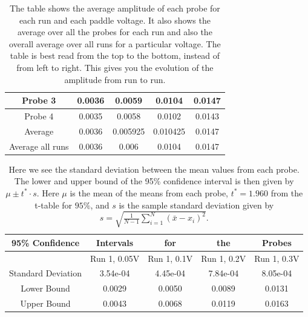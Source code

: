 \documentclass[english,a4paper,12pt]{article}
\begin{document}
\begin{table}[H]
\begin{tabular}{|c|c|c|c|c|}
Probe 3 &         0.0036 &         0.0059 &         0.0104 &         0.0147 \\ \hline
Probe 4 &         0.0035 &         0.0058   &  0.0102 &      0.0143 \\ \hline \hline
Average &  0.0036 &      0.005925 &      0.010425 &       0.0147 \\ \hline \hline \hline
Average all runs & 0.0036 &      0.006 & 0.0104 &         0.0147 \\ \hline
    \end{tabular}
    \caption{The table shows the average amplitude of each probe for each run and each paddle voltage. It also shows the average over all the probes for each run and also the overall average over all runs for a particular voltage. The table is best read from the top to the bottom, instead of from left to right. This gives you the evolution of the amplitude from run to run.}
    \label{tab:amplitudes}
\end{table}

\begin{table}[H]
    \centering
    \begin{tabular}{|c|c|c|c|c|} \hline
    95\% Confidence & Intervals & for & the & Probes\\ \hline \hline
&      Run 1, 0.05V &       Run 1, 0.1V &  Run 1, 0.2V &     Run 1, 0.3V \\ \hline
Standard Deviation & 3.54e-04 & 4.45e-04 & 7.84e-04 & 8.05e-04 \\ \hline
Lower Bound & 0.0029 & 0.0050 & 0.0089 & 0.0131 \\ \hline
Upper Bound & 0.0043 & 0.0068 & 0.0119 & 0.0163 \\ \hline
    \end{tabular}
    \caption{Here we see the standard deviation between the mean values from each probe. The lower and upper bound of the 95\% confidence interval is then given by $\mu \pm t^*\cdot s$. Here $\mu$ is the mean of the means from each probe, $t^* = 1.960$ from the t-table for $95\%$, and $s$ is the sample standard deviation given by $s=\sqrt{\frac{1}{N-1}\sum_{i=1}^N(\bar{x}-x_i)^2}$.}
    \label{tab:CI}
\end{table}
\end{document}

